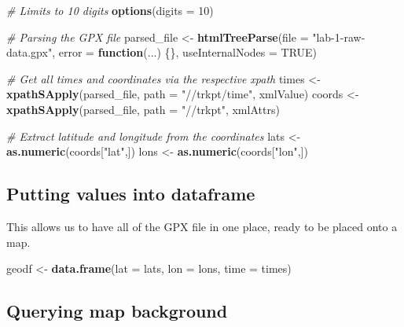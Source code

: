 \documentclass[
]{article}
\newenvironment{Shaded}{\begin{snugshade}}{\end{snugshade}}
\newcommand{\CommentTok}[1]{\textcolor[rgb]{0.56,0.35,0.01}{\textit{#1}}}
\newcommand{\ControlFlowTok}[1]{\textcolor[rgb]{0.13,0.29,0.53}{\textbf{#1}}}
\newcommand{\DataTypeTok}[1]{\textcolor[rgb]{0.13,0.29,0.53}{#1}}
\newcommand{\DecValTok}[1]{\textcolor[rgb]{0.00,0.00,0.81}{#1}}
\newcommand{\KeywordTok}[1]{\textcolor[rgb]{0.13,0.29,0.53}{\textbf{#1}}}
\newcommand{\NormalTok}[1]{#1}
\newcommand{\OtherTok}[1]{\textcolor[rgb]{0.56,0.35,0.01}{#1}}
\newcommand{\StringTok}[1]{\textcolor[rgb]{0.31,0.60,0.02}{#1}}
\begin{document}
\begin{Shaded}
\begin{Highlighting}[]
\CommentTok{# Limits to 10 digits}
\KeywordTok{options}\NormalTok{(}\DataTypeTok{digits =} \DecValTok{10}\NormalTok{)}

\CommentTok{# Parsing the GPX file}
\NormalTok{parsed_file <-}\StringTok{ }\KeywordTok{htmlTreeParse}\NormalTok{(}\DataTypeTok{file =} \StringTok{"lab-1-raw-data.gpx"}\NormalTok{,}
                             \DataTypeTok{error =} \ControlFlowTok{function}\NormalTok{(...) \{\},}
                             \DataTypeTok{useInternalNodes =} \OtherTok{TRUE}\NormalTok{)}

\CommentTok{# Get all times and coordinates via the respective xpath}
\NormalTok{times <-}\StringTok{ }\KeywordTok{xpathSApply}\NormalTok{(parsed_file, }\DataTypeTok{path =} \StringTok{"//trkpt/time"}\NormalTok{, xmlValue)}
\NormalTok{coords <-}\StringTok{ }\KeywordTok{xpathSApply}\NormalTok{(parsed_file, }\DataTypeTok{path =} \StringTok{"//trkpt"}\NormalTok{, xmlAttrs)}

\CommentTok{# Extract latitude and longitude from the coordinates}
\NormalTok{lats <-}\StringTok{ }\KeywordTok{as.numeric}\NormalTok{(coords[}\StringTok{"lat"}\NormalTok{,])}
\NormalTok{lons <-}\StringTok{ }\KeywordTok{as.numeric}\NormalTok{(coords[}\StringTok{"lon"}\NormalTok{,])}
\end{Highlighting}
\end{Shaded}

\hypertarget{putting-values-into-dataframe}{%
\subsection{Putting values into
dataframe}\label{putting-values-into-dataframe}}

This allows us to have all of the GPX file in one place, ready to be
placed onto a map.

\begin{Shaded}
\begin{Highlighting}[]
\NormalTok{geodf <-}\StringTok{ }\KeywordTok{data.frame}\NormalTok{(}\DataTypeTok{lat =}\NormalTok{ lats, }\DataTypeTok{lon =}\NormalTok{ lons, }\DataTypeTok{time =}\NormalTok{ times)}
\end{Highlighting}
\end{Shaded}

\hypertarget{querying-map-background}{%
\subsection{Querying map background}\label{querying-map-background}}
\end{document}
